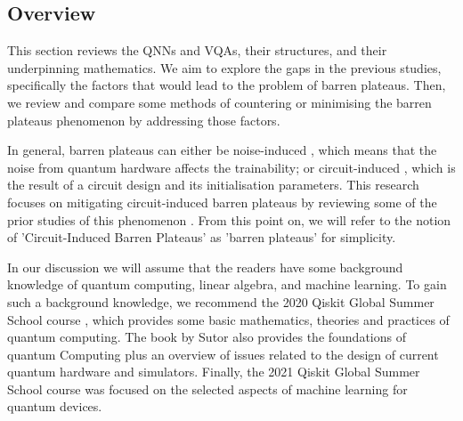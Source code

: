 \subsection{Overview}
This section reviews the QNNs and VQAs, their structures, and their underpinning mathematics. 
We aim to explore the gaps in the previous studies, specifically the factors that would lead to the problem of barren plateaus.
Then, we review and compare some methods of countering or minimising the barren plateaus phenomenon by addressing those factors.

In general, barren plateaus can either be noise-induced \cite{wangNoiseinducedBarrenPlateaus2021}, which means that the noise from quantum hardware affects the trainability; 
or circuit-induced \cite{mccleanBarrenPlateausQuantum2018}, which is the result of a circuit design and its initialisation parameters.
This research focuses on mitigating circuit-induced barren plateaus by reviewing some of the prior studies of this phenomenon \cite{pesahAbsenceBarrenPlateaus2021, cerezoCostFunctionDependent2021, skolikLayerwiseLearningQuantum2021}.
From this point on, we will refer to the notion of 'Circuit-Induced Barren Plateaus' as 'barren plateaus' for simplicity.

In our discussion we will assume that the readers have some background knowledge of quantum computing, linear algebra, and machine learning. 
To gain such a background knowledge, we recommend the 2020 Qiskit Global Summer School course \cite{2020QiskitGlobal}, which provides some basic mathematics, theories and practices of quantum computing. 
The book by Sutor \cite{sutorDancingQubitsHow2019} also provides the foundations of quantum Computing plus an overview of issues related to the design of current quantum hardware and simulators.
Finally, the 2021 Qiskit Global Summer School course \cite{2021QiskitGlobal} was focused on the selected aspects of machine learning for quantum devices.